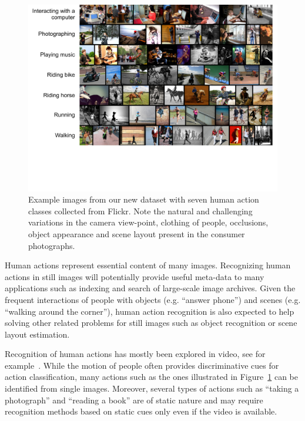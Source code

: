 \documentclass{bmvc2k}
\newcommand{\red}[1]{{\em \small \color{red} #1}} %
\newcommand{\capnspc}{\vspace*{-4mm}}       %
\newcommand{\cfs}{\small}   %
\begin{document}
\label{sec:intro}



\begin{figure}[tbp]
 \small
\includegraphics[width=.95\linewidth]{figs/my_dataset_cropped.pdf}
\capnspc
\caption{\cfs Example images from our new dataset with seven human action classes collected from Flickr.
Note the natural and challenging variations in the camera view-point, clothing of people, occlusions, object appearance and scene layout present in the consumer photographs.
 \normalsize
   }
 \label{fig:dataset}
\capnspc
\end{figure}


Human actions represent essential content of many images. Recognizing human actions in still images will potentially provide useful meta-data to many applications such as indexing and search of large-scale image archives. Given the frequent interactions of people with objects (e.g. ``answer phone'') and scenes (e.g. ``walking around the corner''), human action recognition is also expected to help solving other related problems for still images such as object recognition or  scene layout estimation.

Recognition of human actions has mostly been explored in video, see for example~\cite{BoDa01,Laptev08,MHK06}. While the motion of people often provides discriminative cues for action classification, many actions such as the ones illustrated in Figure~\ref{fig:dataset} can be identified from single images. Moreover, several types of actions such as ``taking a photograph'' and ``reading a book'' are of static nature and may require recognition methods based on static cues only even if the video is available.
\end{document}
